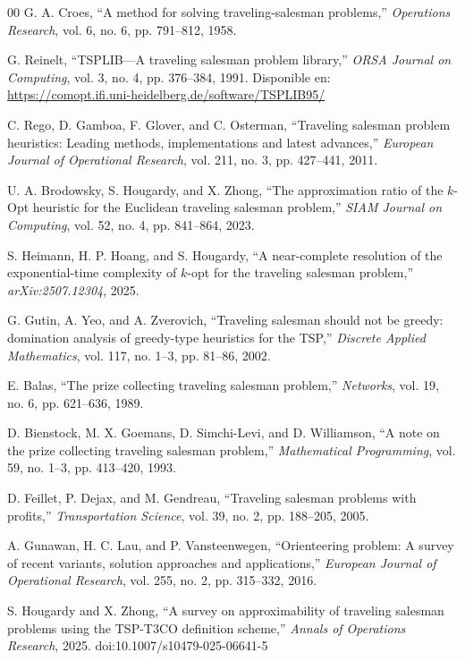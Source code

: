 \begin{thebibliography}{00}
 G. A. Croes, 
``A method for solving traveling-salesman problems,'' 
\textit{Operations Research}, vol. 6, no. 6, pp. 791--812, 1958.

 G. Reinelt,
``TSPLIB—A traveling salesman problem library,''
\textit{ORSA Journal on Computing}, vol. 3, no. 4, pp. 376--384, 1991.
Disponible en: \url{https://comopt.ifi.uni-heidelberg.de/software/TSPLIB95/}

 C. Rego, D. Gamboa, F. Glover, and C. Osterman,
``Traveling salesman problem heuristics: Leading methods, implementations and latest advances,''
\textit{European Journal of Operational Research}, vol. 211, no. 3, pp. 427--441, 2011.

 U. A. Brodowsky, S. Hougardy, and X. Zhong,
``The approximation ratio of the $k$-Opt heuristic for the Euclidean traveling salesman problem,''
\textit{SIAM Journal on Computing}, vol. 52, no. 4, pp. 841--864, 2023.

 S. Heimann, H. P. Hoang, and S. Hougardy,
``A near-complete resolution of the exponential-time complexity of $k$-opt for the traveling salesman problem,''
\textit{arXiv:2507.12304}, 2025.

 G. Gutin, A. Yeo, and A. Zverovich,
``Traveling salesman should not be greedy: domination analysis of greedy-type heuristics for the TSP,''
\textit{Discrete Applied Mathematics}, vol. 117, no. 1--3, pp. 81--86, 2002.

 E. Balas,
``The prize collecting traveling salesman problem,''
\textit{Networks}, vol. 19, no. 6, pp. 621--636, 1989.

 D. Bienstock, M. X. Goemans, D. Simchi-Levi, and D. Williamson,
``A note on the prize collecting traveling salesman problem,''
\textit{Mathematical Programming}, vol. 59, no. 1--3, pp. 413--420, 1993.

 D. Feillet, P. Dejax, and M. Gendreau,
``Traveling salesman problems with profits,''
\textit{Transportation Science}, vol. 39, no. 2, pp. 188--205, 2005.

 A. Gunawan, H. C. Lau, and P. Vansteenwegen,
``Orienteering problem: A survey of recent variants, solution approaches and applications,''
\textit{European Journal of Operational Research}, vol. 255, no. 2, pp. 315--332, 2016.

 S. Hougardy and X. Zhong,
``A survey on approximability of traveling salesman problems using the TSP-T3CO definition scheme,''
\textit{Annals of Operations Research}, 2025. doi:10.1007/s10479-025-06641-5


\end{thebibliography}
